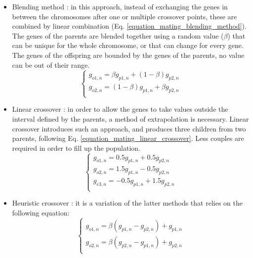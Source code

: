 \documentclass{ametsoc}
\begin{document}
\begin{itemize}
	\item Blending method \citep{Radcliffe1991a}: in this approach, instead of exchanging the genes in between the chromosomes after one or multiple crossover points, these are combined by linear combination (Eq. \ref{equation_mating_blending_method}). The genes of the parents are blended together using a random value ($\beta$) that can be unique for the whole chromosome, or that can change for every gene. The genes of the offspring are bounded by the genes of the parents, no value can be out of their range.
	\begin{equation}
	\left\lbrace \begin{array}{l} 
	g_{o1,n} = \beta g_{p1,n} + (1-\beta)g_{p2,n} \\ 
	g_{o2,n} = (1-\beta) g_{p1,n} + \beta g_{p2,n} \\
	\end{array} \right.
	\label{equation_mating_blending_method}
	\end{equation}
	
	\item Linear crossover \citep{Wright1991a}: in order to allow the genes to take values outside the interval defined by the parents, a method of extrapolation is necessary. Linear crossover introduces such an approach, and produces three children from two parents, following Eq. \ref{equation_mating_linear_crossover}. Less couples are required in order to fill up the population.
	\begin{equation}
	\left\lbrace \begin{array}{l} 
	g_{o1,n} = 0.5 g_{p1,n} + 0.5 g_{p2,n} \\ 
	g_{o2,n} = 1.5 g_{p1,n} - 0.5 g_{p2,n} \\ 
	g_{e3,n} = - 0.5 g_{p1,n} + 1.5 g_{p2,n} \\ 
	\end{array} \right.
	\label{equation_mating_linear_crossover}
	\end{equation}
	
	\item Heuristic crossover \citep{Michalewicz1996}: it is a variation of the latter methods that relies on the following equation:
	\begin{equation}
	\left\lbrace \begin{array}{l} 
	g_{o1,n} = \beta (g_{p1,n} - g_{p2,n}) + g_{p1,n} \\
	g_{o2,n} = \beta (g_{p2,n} - g_{p1,n}) + g_{p2,n} \\
	\end{array} \right.
	\label{equation_mating_heuristic_crossover}
	\end{equation}
	

\end{itemize}
\end{document}
